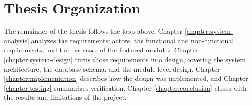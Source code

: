 \section{Thesis Organization}

The remainder of the thesis follows the loop above. Chapter \ref{chapter:system-analysis} analyzes the requirements: actors, the functional and non-functional requirements, and the use cases of the featured modules. Chapter \ref{chapter:system-design} turns those requirements into design, covering the system architecture, the database schema, and the module-level design. Chapter \ref{chapter:implementation} describes how the design was implemented, and Chapter \ref{chapter:testing} summarizes verification. Chapter \ref{chapter:conclusion} closes with the results and limitations of the project.\\